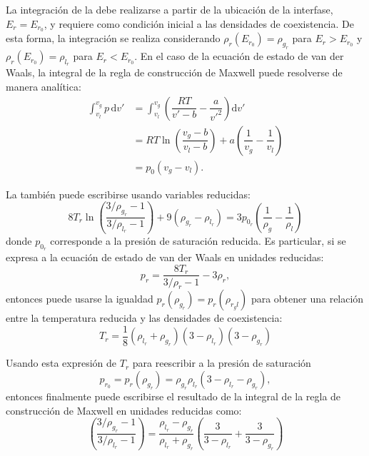 La integraci\'on de la  debe realizarse a partir de la ubicaci\'on de la interfase, $E_r = E_{r_0}$, y requiere como condici\'on inicial a las densidades de coexistencia. De esta forma, la integraci\'on se realiza considerando $\rho_r(E_{r_0}) = \rho_{g_r}$ para $E_r > E_{r_0}$ y $\rho_r(E_{r_0}) = \rho_{l_r}$ para $E_r < E_{r_0}$. En el caso de la ecuaci\'on de  estado de van der Waals, la integral de la regla de construcci\'on de Maxwell puede resolverse de manera anal\'itica:
\begin{align}
	\int_{v_l}^{v_g} p \, \mbox{d}v' &= \int_{v_l}^{v_g} \left( \dfrac{RT}{v'-b} - \dfrac{a}{v'^2} \right) \mbox{d}v'	\\
		&= RT \ln \left( \dfrac{v_g - b}{v_l-b} \right) + a\left( \dfrac{1}{v_g} - \dfrac{1}{v_l} \right) \\
		&= p_0(v_g-v_l).
		\label{eq:vdw_maxwell_analitica}
\end{align}

La  tambi\'en puede escribirse usando variables reducidas:
\begin{equation}
	8T_r \ln \left( \dfrac{3/\rho_{g_r}-1}{3/\rho_{l_r}-1} \right) + 9(\rho_{g_r} - \rho_{l_r}) = 3p_{0_r} \left( \dfrac{1}{\rho_g} - \dfrac{1}{\rho_l} \right)
\end{equation}
donde $p_{0_r}$ corresponde a la presi\'on de saturaci\'on reducida. Es particular, si se expresa a la ecuaci\'on de estado de van der Waals en unidades reducidas:
\begin{equation}
 p_r = \dfrac{8 T_r}{3/\rho_r-1} - 3\rho_r,
\end{equation}
entonces puede usarse la igualdad $p_r(\rho_{g_r}) = p_r(\rho_{r_gl})$ para obtener una relaci\'on entre la temperatura reducida y las densidades de coexistencia:
\begin{equation}
	T_r = \dfrac{1}{8}(\rho_{l_r}+\rho_{g_r})(3-\rho_{l_r})(3-\rho_{g_r})
	\label{eq:tr_maxwell}
\end{equation}

Usando esta expresi\'on de $T_r$ para reescribir a la presi\'on de saturaci\'on
\begin{equation}
	p_{r_0} = p_r(\rho_{g_r}) = \rho_{g_r} \rho_{l_r} ( 3 - \rho_{l_r} - \rho_{g_r} ),
\end{equation}
entonces finalmente puede escribirse el resultado de la integral de la regla de construcci\'on de Maxwell en unidades reducidas como:
\begin{equation}
	\left( \dfrac{3/\rho_{g_r}-1}{3/\rho_{l_r}-1} \right) = \dfrac{\rho_{l_r} - \rho_{g_r}}{\rho_{l_r} + \rho_{g_r}}\left( \dfrac{3}{3-\rho_{l_r}} + \dfrac{3}{3-\rho_{g_r}} \right)
	\label{eq:rhor_maxwell}
\end{equation}

